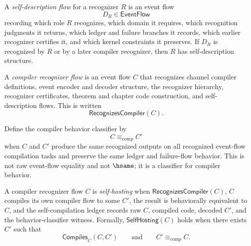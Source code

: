 \begin{definition}
\label{def:recognizer-generated-self-description}
A \emph{self-description flow} for a recognizer $R$ is an event flow
$$
  D_R\in\mathsf{EventFlow}
$$
recording which role $R$ recognizes, which domain it requires, which recognition judgments it returns, which ledger and failure branches it records, which earlier recognizer certifies it, and which kernel constraints it preserves. If $D_R$ is recognized by $R$ or by a later compiler recognizer, then $R$ has self-description structure.
\end{definition}

\begin{definition}
\label{def:recognizer-generated-compiler-recognizer-flow}
A \emph{compiler recognizer flow} is an event flow $C$ that recognizes channel compiler definitions, event encoder and decoder structure, the recognizer hierarchy, recognizer certificates, theorem and chapter code construction, and self-description flows. This is written
$$
  \mathsf{RecognizesCompiler}(C).
$$
\end{definition}

\begin{definition}
\label{def:recognizer-generated-compiler-behavior-classifier}
Define the compiler behavior classifier by
$$
  C\equiv_{\mathrm{comp}} C'
$$
when $C$ and $C'$ produce the same recognized outputs on all recognized event-flow compilation tasks and preserve the same ledger and failure-flow behavior. This is not raw event-flow equality and not $\hsame$; it is a classifier for compiler behavior.
\end{definition}

\begin{definition}
\label{def:recognizer-generated-self-hosting-compiler-flow}
A compiler recognizer flow $C$ is \emph{self-hosting} when $\mathsf{RecognizesCompiler}(C)$, $C$ compiles its own compiler flow to some $C'$, the result is behaviorally equivalent to $C$, and the self-compilation ledger records raw $C$, compiled code, decoded $C'$, and the behavior-classifier witness. Formally, $\mathsf{SelfHosting}(C)$ holds when there exists $C'$ such that
$$
  \mathsf{Compiles}_C(C,C')
  \qquad\text{and}\qquad
  C'\equiv_{\mathrm{comp}} C.
$$
\end{definition}

